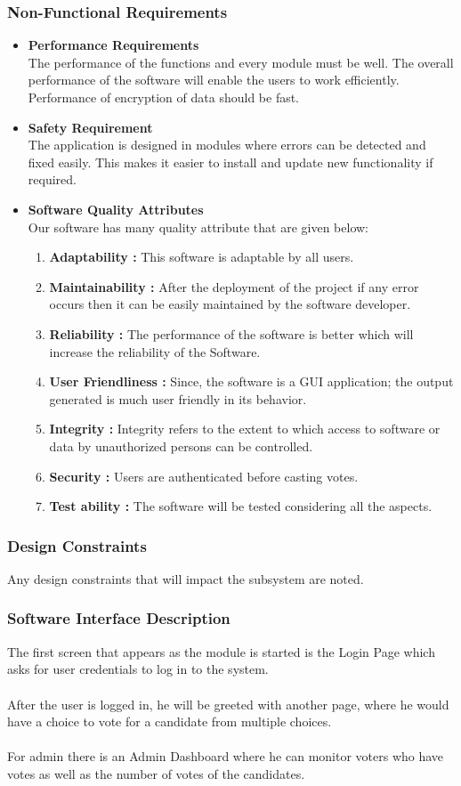 \documentclass[oneside, 12pt]{book}
\begin{document}
\subsubsection{Non-Functional Requirements}
\begin{itemize}
	\item\textbf{Performance Requirements}\\The performance of the functions and every module must be well. The overall performance of the software will enable the users to work efficiently. Performance of encryption of data should be fast.
	\item\textbf{Safety Requirement}\\The application is designed in modules where errors can be detected and fixed easily. This makes it easier to install and update new functionality if required.
	\item\textbf{Software Quality Attributes}\\Our software has many quality attribute that are given below:
	\begin{enumerate}
		\item\textbf{Adaptability :} This software is adaptable by all users.
		\item\textbf{Maintainability :} After the deployment of the project if any error occurs then it can be easily maintained by the software developer.
		\item\textbf{Reliability :} The performance of the software is better which will increase the reliability of the Software.
		\item\textbf{User Friendliness :} Since, the software is a GUI application; the output generated is much user friendly in its behavior.
		\item\textbf{Integrity :} Integrity refers to the extent to which access to software or data by unauthorized persons can be controlled.
		\item\textbf{Security :} Users are authenticated before casting votes.
		\item\textbf{Test ability :} The software will be tested considering all the aspects.
	\end{enumerate}
\end{itemize}
\subsubsection{Design Constraints}
Any design constraints that will impact the subsystem are noted.
\subsubsection{Software Interface Description}
The first screen that appears as the module is started is the Login Page which asks for user credentials to log in to the system.
\\\\After the user is logged in, he will be greeted with another page, where he would have a choice to vote for a candidate from multiple choices.
\\\\For admin there is an Admin Dashboard where he can monitor voters who have votes as well as the number of votes of the candidates.
\newpage
\end{document}
